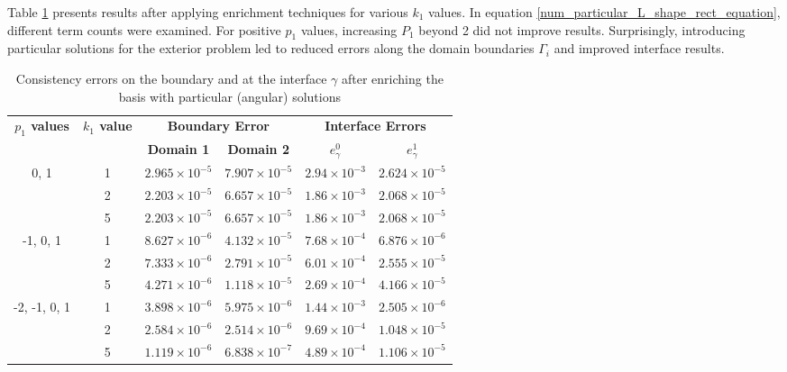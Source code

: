 \documentclass[5p,authoryear]{elsarticle}
\begin{document}
Table \ref{tab:transmission_results_L_shape_rectangles_particular} presents results after applying enrichment techniques for various \(k_1\) values. In equation \eqref{num_particular_L_shape_rect_equation}, different term counts were examined. For positive \(p_1\) values, increasing \(P_1\) beyond 2 did not improve results. Surprisingly, introducing particular solutions for the exterior problem led to reduced errors along the domain boundaries \(\Gamma_i\) and improved interface results.
\begin{table}
    \centering
    \footnotesize %
    \setlength{\tabcolsep}{1pt} %
    \begin{tabular}{cccccc}
        \toprule
        \multicolumn{1}{c}{\textbf{\(p_1\) values}} & \multicolumn{1}{c}{\textbf{\(k_1\) value}} & \multicolumn{2}{c}{\textbf{Boundary Error}} & \multicolumn{2}{c}{\textbf{Interface Errors}} \\
        \cmidrule(lr){2-2} \cmidrule(lr){3-4} \cmidrule(lr){5-6}
        & & \textbf{Domain 1} & \textbf{Domain 2} & \textbf{\(e_\gamma^0\)} & \textbf{\(e_\gamma^1\)} \\
        \midrule

        0, 1 & 1 & $2.965\times10^{-5}$ & $7.907\times10^{-5}$ & $2.94\times10^{-3}$ & $2.624\times10^{-5}$ \\
        & 2 & $2.203\times10^{-5}$ & $6.657\times10^{-5}$ & $1.86\times10^{-3}$ & $2.068\times10^{-5}$ \\
        & 5 & $2.203\times10^{-5}$ & $6.657\times10^{-5}$ & $1.86\times10^{-3}$ & $2.068\times10^{-5}$ \\
        \midrule

        -1, 0, 1 & 1 & $8.627\times10^{-6}$ & $4.132\times10^{-5}$ & $7.68\times10^{-4}$ & $6.876\times10^{-6}$ \\
        & 2 & $7.333\times10^{-6}$ & $2.791\times10^{-5}$ & $6.01\times10^{-4}$ & $2.555\times10^{-5}$ \\
        & 5 & $4.271\times10^{-6}$ & $1.118\times10^{-5}$ & $2.69\times10^{-4}$ & $4.166\times10^{-5}$ \\
        \midrule

        -2, -1, 0, 1 & 1 & $3.898\times10^{-6}$ & $5.975\times10^{-6}$ & $1.44\times10^{-3}$ & $2.505\times10^{-6}$ \\
        & 2 & $2.584\times10^{-6}$ & $2.514\times10^{-6}$ & $9.69\times10^{-4}$ & $1.048\times10^{-5}$ \\
        & 5 & $1.119\times10^{-6}$ & $6.838\times10^{-7}$ & $4.89\times10^{-4}$ & $1.106\times10^{-5}$ \\
        \bottomrule
    \end{tabular}
    \caption{Consistency errors on the boundary and at the interface \(\gamma\) after enriching the basis with particular (angular) solutions}
    \label{tab:transmission_results_L_shape_rectangles_particular}
\end{table}
\end{document}
